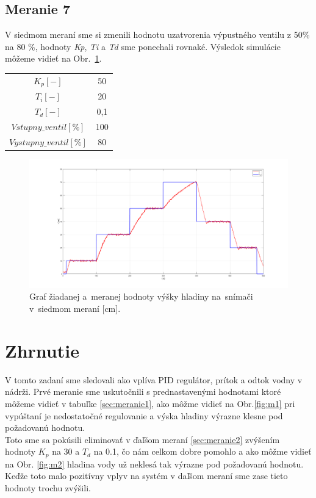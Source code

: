\documentclass{article}
\begin{document}
\clearpage

\subsection{Meranie 7}
\label{sec:meranie6}

V siedmom meraní sme si zmenili hodnotu uzatvorenia výpustného ventilu z 50\% na 80 \%, hodnoty
\textit{Kp}, \textit{Ti} a \textit{Td} sme ponechali rovnaké. Výsledok simulácie môžeme vidieť na Obr.~\ref{fig:m7}.

\begin{center}
\begin{tabular}{ |c|c| }
 \hline
 $K_p [-]$ & 50 \\
 $T_i [-]$ & 20 \\
 $T_d [-]$ & 0,1 \\
 \hline
 $Vstupny\_ventil[\%]$ & 100 \\
 $Vystupny\_ventil[\%]$ & 80 \\
 \hline
\end{tabular}
\end{center}


\begin{figure}[!htbp]
	\begin{center}
		\includegraphics[width=\textwidth]{./include/meranie7.png}
	\end{center}
	\caption{Graf žiadanej a~meranej hodnoty výšky hladiny na~snímači v~siedmom meraní [cm].}
	\label{fig:m7}
\end{figure}


\clearpage

\section{Zhrnutie}
\label{sec:zhrnutie}

\tab V tomto zadaní sme sledovali ako vplíva PID regulátor, prítok a odtok vodny v nádrži. 
Prvé meranie sme uskutočnili s prednastavenými hodnotami ktoré môžeme vidieť v tabuľke \ref{sec:meranie1}, 
ako môžme vidieť na Obr.\ref{fig:m1} pri vypúštaní je nedostatočné regulovanie a výska hladiny výrazne klesne pod požadovanú hodnotu.  
\\
\tab
Toto sme sa pokúsili eliminovať v ďaľšom meraní \ref{sec:meranie2} zvýšením hodnoty $K_p$ na 30 a $T_d$ na 0.1, čo nám celkom dobre pomohlo a ako môžme vidieť na Obr. \ref{fig:m2} hladina vody už neklesá tak výrazne pod požadovanú hodnotu. 
\\
\tab 
Keďže toto malo pozitívny vplyv na systém v daľšom meraní sme zase tieto hodnoty trochu zvýšili.
\end{document}
